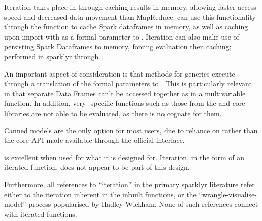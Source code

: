 Iteration takes place in  through caching results in memory,
allowing faster access speed and decreased data movement than
MapReduce\cite{zaharia2010spark}.
 can use this functionality through the  function to cache Spark dataframes in memory, as well as caching upon import with  as a formal parameter to .
Iteration can also make use of persisting Spark Dataframes to memory, forcing evaluation then caching; performed in sparklyr through .

An important aspect of consideration is that  methods for  generics execute through a translation of the formal parameters to .
This is particularly relevant in that separate  Data Frames can't be accessed together as in a multivariable function. 
In addition, very \R-specific functions such as those from the  and  core libraries are not able to be evaluated, as there is
no  cognate for them.

Canned models are the only option for most users, due to  reliance on  rather than the  core API
made available through the official  interface.

 is excellent when used for what it is designed for. Iteration,
in the form of an iterated function, does not appear to be part of this
design.

Furthermore, all references to ``iteration'' in the primary sparklyr
literature refer either to the iteration inherent in the inbuilt  functions, or the ``wrangle-visualise-model'' process popularised by
Hadley Wickham\cites{luraschi2019mastering,wickham2016r}. None of such
references connect with iterated functions.

